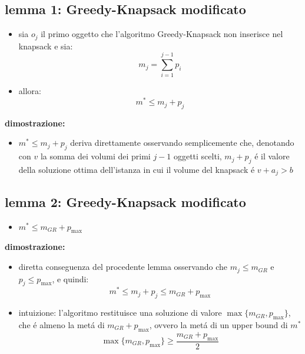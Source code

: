 \subsection*{lemma 1: Greedy-Knapsack modificato}
\begin{flushleft}
	\begin{itemize}
		\item sia $o_j$ il primo oggetto che l'algoritmo Greedy-Knapsack non inserisce nel knapsack e sia:
			$$m_j=\sum_{i=1}^{j-1}p_i$$
		\item allora:
			$$m^*\leq m_j+p_j$$
	\end{itemize}
	\vspace{0.5cm}
	\textbf{dimostrazione:}
	\begin{itemize}
		\item $m^*\leq m_j+p_j$ deriva direttamente osservando semplicemente che, denotando con $v$ la somma dei volumi dei primi $j-1$ oggetti scelti, $m_j+p_j$ \'e il valore della soluzione ottima dell'istanza in cui il volume del knapsack \'e $v+a_j>b$
	\end{itemize}
\end{flushleft}


\subsection*{lemma 2: Greedy-Knapsack modificato}
\begin{flushleft}
	\begin{itemize}
		\item $m^*\leq m_{GR}+p_{\max}$
	\end{itemize}
	\vspace{0.5cm}
	\textbf{dimostrazione:}
	\begin{itemize}
		\item diretta conseguenza del procedente lemma osservando che $m_j\leq m_{GR}$ e $p_j\leq p_{\max}$, e quindi:
			$$m^*\leq m_j+p_j\leq m_{GR}+p_{\max}$$
		\item intuizione: l'algoritmo restituisce una soluzione di valore $\max\{m_{GR},p_{\max}\}$, che \'e almeno la met\'a di $m_{GR}+p_{\max}$, ovvero la met\'a di un upper bound di $m^*$
			$$\max\{m_{GR},p_{\max}\}\geq\frac{m_{GR}+p_{\max}}{2}$$
	\end{itemize}
\end{flushleft}


